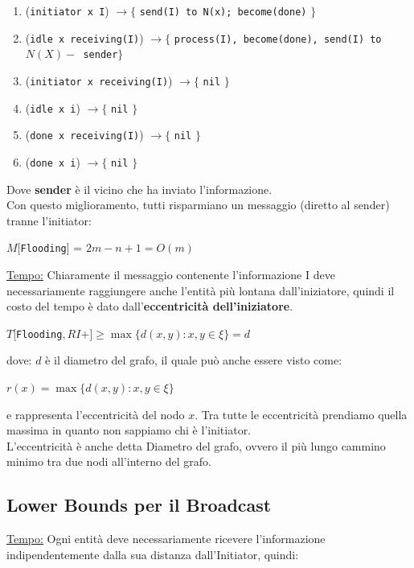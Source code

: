 \begin{enumerate}
    \item (\texttt{initiator x I}) $\rightarrow \lbrace$ \texttt{send(I) to N(x);
              become(done)} $\rbrace$
    \item (\texttt{idle x receiving(I)}) $\rightarrow \lbrace$ \texttt{process(I),
              become(done), send(I) to $N(X) -$ {sender}}$\rbrace$
    \item (\texttt{initiator x receiving(I)}) $\rightarrow \lbrace$ \texttt{nil}
          $\rbrace$
    \item (\texttt{idle x i}) $\rightarrow \lbrace$ \texttt{nil} $\rbrace$
    \item (\texttt{done x receiving(I)}) $\rightarrow \lbrace$ \texttt{nil}
          $\rbrace$
    \item (\texttt{done x i}) $\rightarrow \lbrace$ \texttt{nil} $\rbrace$
\end{enumerate}
Dove \textbf{sender} è il vicino che ha inviato l'informazione.\\
Con questo miglioramento, tutti risparmiano un messaggio (diretto al sender)
tranne l'initiator:
\begin{center}
    $M[$\texttt{Flooding}] = $2m-n+1=O(m)$
\end{center}

\underline{Tempo:}
Chiaramente il messaggio contenente l'informazione I deve necessariamente
raggiungere anche l'entità più lontana dall'iniziatore, quindi il costo del
tempo è dato dall'\textbf{eccentricità dell'iniziatore}.
\begin{center}
    $T[$\texttt{Flooding}$, RI+] \geq \max \lbrace d(x,y) : x, y \in \xi \rbrace =
        d$
\end{center}
dove: $d$ è il diametro del grafo, il quale può anche essere visto come:
\begin{center}
    $r(x) = \max \lbrace d(x, y) : x, y \in \xi \rbrace$
\end{center}
e rappresenta l'eccentricità del nodo $x$. Tra tutte le eccentricità prendiamo
quella massima in quanto non sappiamo chi è l'initiator.\\
L'eccentricità è anche detta Diametro del grafo, ovvero il più lungo cammino
minimo tra due nodi all'interno del grafo.

\subsection{Lower Bounds per il Broadcast}
\underline{Tempo:}
Ogni entità deve necessariamente ricevere l'informazione indipendentemente dalla
sua distanza dall'Initiator, quindi:

